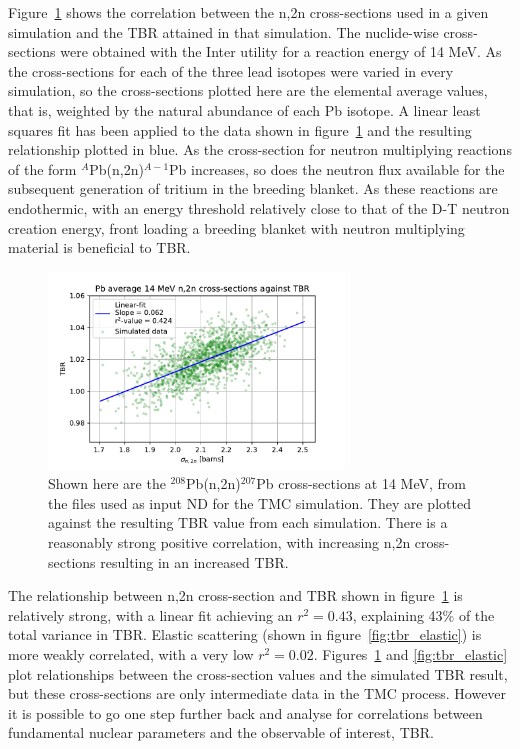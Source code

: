 Figure~\ref{fig:tbr_n2n} shows the correlation between the n,2n cross-sections used in a given simulation and the TBR attained in that simulation. The nuclide-wise cross-sections were obtained with the Inter utility for a reaction energy of 14 MeV. As the cross-sections for each of the three lead isotopes were varied in every simulation, so the cross-sections plotted here are the elemental average values, that is, weighted by the natural abundance of each Pb isotope. A linear least squares fit has been applied to the data shown in figure~\ref{fig:tbr_n2n} and the resulting relationship plotted in blue. As the cross-section for neutron multiplying reactions of the form $^{A}$Pb(n,2n)$^{A-1}$Pb increases, so does the neutron flux available for the subsequent generation of tritium in the breeding blanket. As these reactions are endothermic, with an energy threshold relatively close to that of the D-T neutron creation energy, front loading a breeding blanket with neutron multiplying material is beneficial to TBR.

\begin{figure}[H]
  \centering
	\includegraphics[width=0.7\textwidth]{TBR_n,2n}
	\caption[Correlation between $^{208}$Pb(n,2n)$^{207}$Pb cross-sections and TBR.]{Shown here are the $^{208}$Pb(n,2n)$^{207}$Pb cross-sections at 14 MeV, from the files used as input ND for the TMC simulation. They are plotted against the resulting TBR value from each simulation. There is a reasonably strong positive correlation, with increasing n,2n cross-sections resulting in an increased TBR.}
	\label{fig:tbr_n2n}
\end{figure}

The relationship between n,2n cross-section and TBR shown in figure~\ref{fig:tbr_n2n} is relatively strong, with a linear fit achieving an $r^{2}=0.43$, explaining 43\% of the total variance in TBR. Elastic scattering (shown in figure~\ref{fig:tbr_elastic}) is more weakly correlated, with a very low $r^{2}=0.02$. Figures~\ref{fig:tbr_n2n} and \ref{fig:tbr_elastic} plot relationships between the cross-section values and the simulated TBR result, but these cross-sections are only intermediate data in the TMC process. However it is possible to go one step further back and analyse for correlations between fundamental nuclear parameters and the observable of interest, TBR. 


